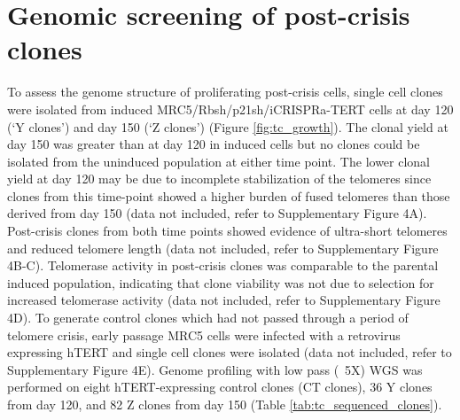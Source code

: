 \documentclass[phd,tocprelim]{cornell}
\begin{document}
\section{Genomic screening of post-crisis clones}
To assess the genome structure of proliferating post-crisis cells, single cell clones were isolated from induced MRC5/Rbsh/p21sh/iCRISPRa-TERT cells at day 120 (‘Y clones’) and day 150 (‘Z clones’) (Figure \ref{fig:tc_growth}). The clonal yield at day 150 was greater than at day 120 in induced cells but no clones could be isolated from the uninduced population at either time point. The lower clonal yield at day 120 may be due to incomplete stabilization of the telomeres since clones from this time-point showed a higher burden of fused telomeres than those derived from day 150 (data not included, refer to \cite{Dewhurst2021-jk} Supplementary Figure 4A). Post-crisis clones from both time points showed evidence of ultra-short telomeres and reduced telomere length (data not included, refer to \cite{Dewhurst2021-jk} Supplementary Figure 4B-C). Telomerase activity in post-crisis clones was comparable to the parental induced population, indicating that clone viability was not due to selection for increased telomerase activity (data not included, refer to \cite{Dewhurst2021-jk} Supplementary Figure 4D). To generate control clones which had not passed through a period of telomere crisis, early passage MRC5 cells were infected with a retrovirus expressing hTERT and single cell clones were isolated (data not included, refer to \cite{Dewhurst2021-jk} Supplementary Figure 4E). Genome profiling with low pass (~5X) WGS was performed on eight hTERT-expressing control clones (CT clones), 36 Y clones from day 120, and 82 Z clones from day 150 (Table \ref{tab:tc_sequenced_clones}).
\end{document}
